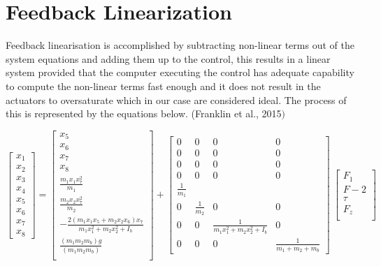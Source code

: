 \documentclass{UoNMCHA}
\numberwithin{equation}{section}
\begin{document}
	\section{Feedback Linearization}
	
	Feedback linearisation is accomplished by subtracting non-linear terms out of the system equations and
	adding them up to the control, this results in a linear system provided that the computer executing the
	control has adequate capability to compute the non-linear terms fast enough and it does not result in the
	actuators to oversaturate which in our case are considered ideal. The process of this is represented by
	the equations below. (Franklin et al., 2015$)$
	
	\begin{equation}
	\begin{bmatrix}
	x_{1} \\
	x_{2} \\
	x_{3} \\
	x_{4} \\
	x_{5} \\
	x_{6} \\
	x_{7} \\
	x_{8}
	\end{bmatrix} = 
	\begin{bmatrix}
	x_{5} \\
	x_{6} \\
	x_{7} \\
	x_{8} \\
	\frac{m_1 x_1 x_7^2}{m_1} \\
	\frac{m_2 x_2 x_7^2}{m_2} \\
	-\frac{2(m_1 x_1 x_5 + m_2 x_2 x_6)x_7}{m_1 x_1^2 + m_2x_2^2 + I_b} \\
	\frac{(m_1 m_2 m_b)g}{(m_1 m_2 m_b)} \\
	\end{bmatrix} +
	\begin{bmatrix}
	0 & 0 & 0 & 0 \\
	0 & 0 & 0 & 0 \\
	0 & 0 & 0 & 0 \\
	0 & 0 & 0 & 0 \\
	\frac{1}{m_{1}} & & & \\
	0 & \frac{1}{m_{2}} & 0 & 0 \\
	0 & 0 & \frac{1}{m_1 x_1^2 + m_2 x_2^2 + I_b} & 0 \\
	0 & 0 & 0 & \frac{1}{m_1  + m_2  + m_b}
	\end{bmatrix}\ 
	\begin{bmatrix}
	F_1 \\
	F-2 \\
	\tau \\
	F_z \\
	\end{bmatrix}
	\end{equation}
	
\end{document}
